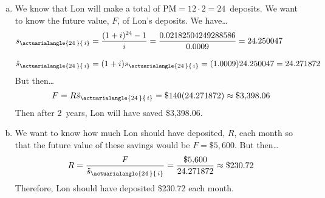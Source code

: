 \documentclass[11pt,letterpaper]{article}
\newcommand{\actS}[2]{s_{\actuarialangle{#1\,}{\,#2}}} %
\newcommand{\actSD}[2]{\ddot{s}_{\actuarialangle{#1\,}{\,#2}}} %
\begin{document}
\begin{enumerate}[(a)]
\item We know that Lon will make a total of $\text{PM}= 12 \cdot 2= 24$~deposits. We want to know the future value, $F$, of Lon's deposits. We have\dots
	\[
	\begin{aligned}
	\actS{24}{i}&= \dfrac{(1 + i)^{24} - 1}{i}= \dfrac{0.02182504249288586}{0.0009}= 24.250047 \\[0.3cm]
	\actSD{24}{i}&= (1 + i) \actS{24}{i}= (1.0009) 24.250047= 24.271872
	\end{aligned}
	\]
But then\dots
	\[
	F= R \actSD{24}{i}= \$140(24.271872) \approx \$3,\!398.06
	\]
Then after 2~years, Lon will have saved \$3,398.06. \pspace

\item We want to know how much Lon should have deposited, $R$, each month so that the future value of these savings would be $F= \$5,\!600$. But then\dots
	\[
	R= \dfrac{F}{\actSD{24}{i}}= \dfrac{\$5,\!600}{24.271872} \approx \$230.72
	\]
Therefore, Lon should have deposited \$230.72 each month. 
\end{enumerate}
\end{document}

